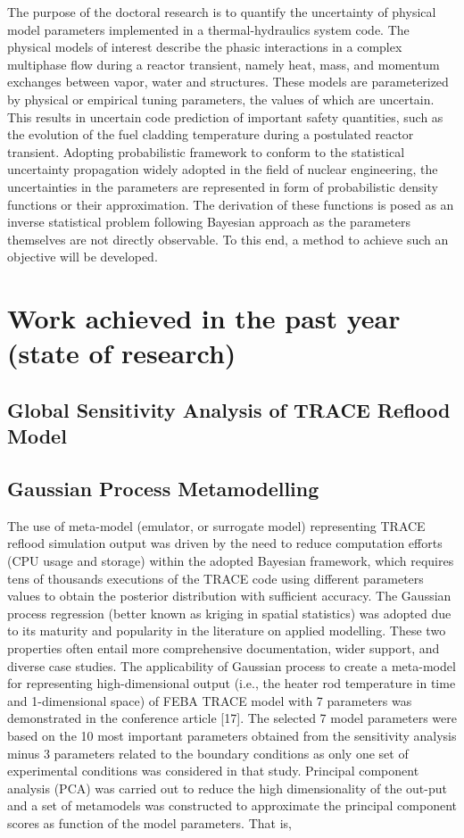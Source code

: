 \documentclass[11pt,titlepage]{article}
\begin{document}
The purpose of the doctoral research is to quantify the uncertainty of physical model parameters implemented in a thermal-hydraulics system code. The physical models of interest describe the phasic interactions in a complex multiphase flow during a reactor transient, namely heat, mass, and momentum exchanges between vapor, water and structures. These models are parameterized by physical or empirical tuning parameters, the values of which are uncertain. This results in uncertain code prediction of important safety quantities, such as the evolution of the fuel cladding temperature during a postulated reactor transient.
Adopting probabilistic framework to conform to the statistical uncertainty propagation widely adopted in the field of nuclear engineering, the uncertainties in the parameters are represented in form of probabilistic density functions or their approximation. The derivation of these functions is posed as an inverse statistical problem following Bayesian approach as the parameters themselves are not directly observable. To this end, a method to achieve such an objective will be developed.

\section{Work achieved in the past year (state of research)}

\subsection{Global Sensitivity Analysis of TRACE Reflood Model}

\subsection{Gaussian Process Metamodelling}

The use of meta-model (emulator, or surrogate model) representing TRACE reflood simulation output was driven by the need to reduce computation efforts (CPU usage and storage) within the adopted Bayesian framework, which requires tens of thousands executions of the TRACE code using different parameters values to obtain the posterior distribution with sufficient accuracy. The Gaussian process regression (better known as kriging in spatial statistics) was adopted due to its maturity and popularity in the literature on applied modelling. These two properties often entail more comprehensive documentation, wider support, and diverse case studies.
The applicability of Gaussian process to create a meta-model for representing high-dimensional output (i.e., the heater rod temperature in time and 1-dimensional space) of FEBA TRACE model with 7 parameters was demonstrated in the conference article [17]. The selected 7 model parameters were based on the 10 most important parameters obtained from the sensitivity analysis minus 3 parameters related to the boundary conditions as only one set of experimental conditions was considered in that study.
Principal component analysis (PCA) was carried out to reduce the high dimensionality of the out-put and a set of metamodels was constructed to approximate the principal component scores as function of the model parameters. That is,
\end{document}
